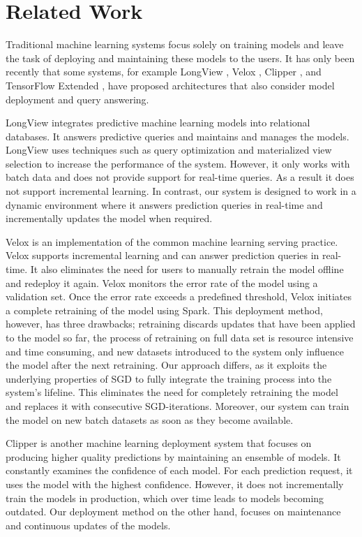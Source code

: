 
\section{Related Work} \label{related-work}
Traditional machine learning systems focus solely on training models and leave the task of deploying and maintaining these models to the users.
It has only been recently that some systems, for example LongView \cite{akdere2011case}, Velox \cite{crankshaw2014missing}, Clipper \cite{crankshaw2016clipper} , and TensorFlow Extended \cite{baylor2017tfx}, have proposed architectures that also consider model deployment and query answering.

LongView integrates predictive machine learning models into relational databases. 
It answers predictive queries and maintains and manages the models.
LongView uses techniques such as query optimization and materialized view selection to increase the performance of the system.
However, it only works with batch data and does not provide support for real-time queries. 
As a result it does not support incremental learning.
In contrast, our system is designed to work in a dynamic environment where it answers prediction queries in real-time and incrementally updates the model when required.

Velox is an implementation of the common machine learning serving practice.
Velox supports incremental learning and can answer prediction queries in real-time.
It also eliminates the need for users to manually retrain the model offline and redeploy it again.
Velox monitors the error rate of the model using a validation set.
Once the error rate exceeds a predefined threshold, Velox initiates a complete retraining of the model using Spark. 
This deployment method, however, has three drawbacks; retraining discards updates that have been applied to the model so far, the process of retraining on full data set is resource intensive and time consuming, and new datasets introduced to the system only influence the model after the next retraining.
Our approach differs, as it exploits the underlying properties of SGD to fully integrate the training process into the system's lifeline.
This eliminates the need for completely retraining the model and replaces it with consecutive SGD-iterations.
Moreover, our system can train the model on new batch datasets as soon as they become available.

Clipper is another machine learning deployment system that focuses on producing higher quality predictions by maintaining an ensemble of models.
It constantly examines the confidence of each model.
For each prediction request, it uses the model with the highest confidence.
However, it does not incrementally train the models in production, which over time leads to models becoming outdated.
Our deployment method on the other hand, focuses on maintenance and continuous updates of the models.

